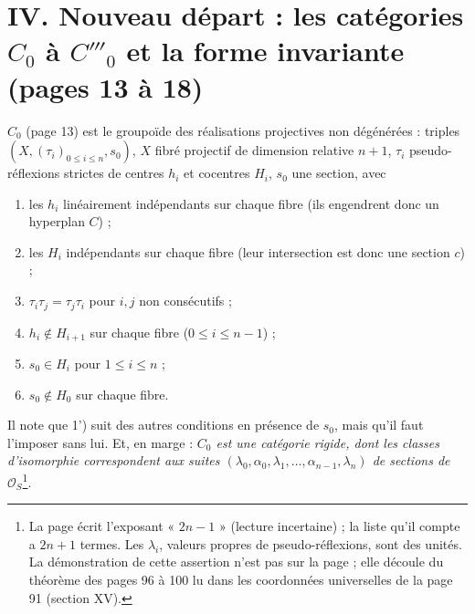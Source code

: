 \documentclass[11pt,a4paper]{article}
\begin{document}
\section*{IV. Nouveau départ : les catégories $C_0$ à $C'''_0$ et la forme invariante (pages 13 à 18)}

\emph{$C_0$} (page 13) est le groupoïde des réalisations projectives non
dégénérées : triples $(X, (\tau_i)_{0 \leqslant i \leqslant n}, s_0)$, $X$ fibré
projectif de dimension relative $n+1$, $\tau_i$ pseudo-réflexions strictes de
centres $h_i$ et cocentres $H_i$, $s_0$ une section, avec
\begin{enumerate}
  \item[1)] les $h_i$ linéairement indépendants sur chaque fibre (ils
    engendrent donc un hyperplan $C$) ;
  \item[1')] les $H_i$ indépendants sur chaque fibre (leur intersection est
    donc une section $c$) ;
  \item[2)] $\tau_i\tau_j = \tau_j\tau_i$ pour $i, j$ non consécutifs ;
  \item[3)] $h_i \notin H_{i+1}$ sur chaque fibre ($0 \leqslant i \leqslant
    n-1$) ;
  \item[4)] $s_0 \in H_i$ pour $1 \leqslant i \leqslant n$ ;
  \item[5)] $s_0 \notin H_0$ sur chaque fibre.
\end{enumerate}
Il note que 1') suit des autres conditions en présence de $s_0$, mais qu'il
faut l'imposer sans lui. Et, en marge : \emph{$C_0$ est une catégorie rigide,
dont les classes d'isomorphie correspondent aux suites $(\lambda_0, \alpha_0,
\lambda_1, \ldots, \alpha_{n-1}, \lambda_n)$ de sections de
$\mathcal{O}_S$}\footnote{La page écrit l'exposant « $2n-1$ » (lecture
incertaine) ; la liste qu'il compte a $2n+1$ termes. Les $\lambda_i$, valeurs
propres de pseudo-réflexions, sont des unités. La démonstration de cette
assertion n'est pas sur la page ; elle découle du théorème des pages 96 à 100
lu dans les coordonnées universelles de la page 91 (section XV).}.
\end{document}
